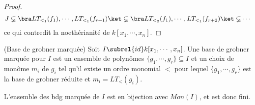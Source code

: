 \begin{proof}
            \begin{align*}
                J \varsubsetneq \bra LT_{<_1}(f_1), \cdots, LT_{<_1}(f_{r+1}) \ket \varsubsetneq \bra LT_{<_2}(f_1), \cdots, LT_{<_1}(f_{r+2}) \ket \varsubsetneq \cdots 
            \end{align*}
            ce qui contredit la noethérianité de $k[x_1, \cdots, x_n]$.
        \end{proof}

        \begin{defi} (Base de grobner marquée)
            Soit $I \subrel{id} k[x_1, \cdots, x_n]$. Une base de grobner marquée pour $I$ est un ensemble de polynômes $\{g_1, \cdots, g_r\} \subseteq I$ et un choix de monôme $m_i$ de $g_i$ tel qu'il existe un ordre monomial $<$ pour lequel $\{g_1, \cdots, g_r\}$ est la base de grobner réduite et $m_i = LT_<(g_i)$.
        \end{defi}
        \begin{coro}
            L'ensemble des bdg marquée de $I$ est en bijection avec $Mon(I)$, et est donc fini.
        \end{coro}
